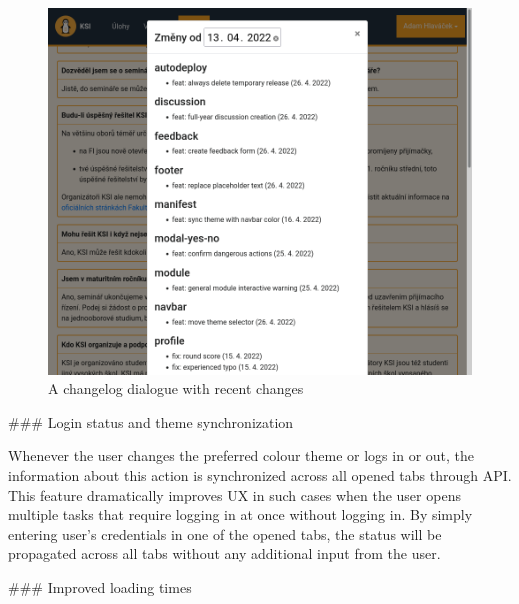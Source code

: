 \documentclass[
  digital, %
  oneside, %
  lof,     %
  nolot,     %
]{fithesis4}
\begin{document}
{\begin{figure}
\includegraphics[width=\textwidth]{assets/img/changelog}
\caption{A changelog dialogue with recent changes}
\label{fig:changelog}
\end{figure}

### Login status and theme synchronization

Whenever the user changes the preferred colour theme or logs in or out, the information about this action is synchronized across all opened tabs through  API. This feature dramatically improves UX in such cases when the user opens multiple tasks that require logging in at once without logging in. By simply entering user's credentials in one of the opened tabs, the status will be propagated across all tabs without any additional input from the user.

### Improved loading times
\label{chap:faster}

}
\end{document}
